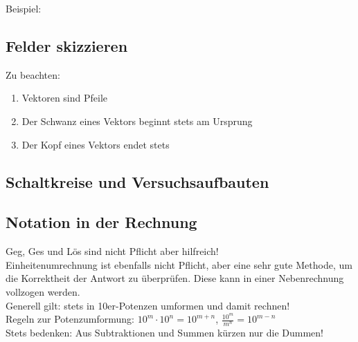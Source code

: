 \documentclass{article}
\begin{document}
        Beispiel:

        \begin{figure}[h]
        \centering
    \end{figure}
        
        \subsection{Felder skizzieren}
        
            Zu beachten:
            \begin{enumerate}
                \item Vektoren sind Pfeile
                \item Der Schwanz eines Vektors beginnt stets am Ursprung
                \item Der Kopf eines Vektors endet stets 
            \end{enumerate}

        \subsection{Schaltkreise und Versuchsaufbauten}

        \subsection{Notation in der Rechnung}

            Geg, Ges und Lös sind nicht Pflicht aber hilfreich! \\
            Einheitenumrechnung ist ebenfalls nicht Pflicht, aber eine sehr gute Methode, um die Korrektheit der Antwort zu überprüfen. Diese kann in einer Nebenrechnung vollzogen werden. \\
            Generell gilt: stets in 10er-Potenzen umformen und damit rechnen! \\
            Regeln zur Potenzumformung: $10^m \cdot 10^n = 10^{m+n}$, $\frac{10^m}{m^n} = 10^{m-n}$ \\
            Stets bedenken: Aus Subtraktionen und Summen kürzen nur die Dummen! \\
\end{document}
